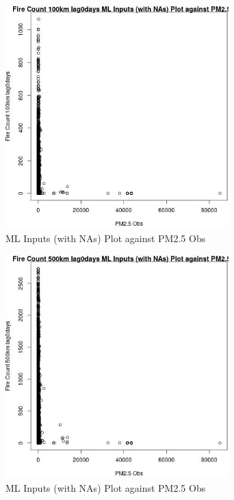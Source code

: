 \begin{figure} 
\centering  
\includegraphics[width=0.77\textwidth]{Code_Outputs/Report_ML_input_PM25_Step4_part_f_de_duplicated_aves_prioritize_24hr_obswNAs_Fire_Count_100km_lag0daysvPM25_Obs.jpg} 
\caption{\label{fig:Report_ML_input_PM25_Step4_part_f_de_duplicated_aves_prioritize_24hr_obswNAsFire_Count_100km_lag0daysvPM25_Obs}ML Inputs (with NAs) Plot against PM2.5 Obs} 
\end{figure} 
 

\begin{figure} 
\centering  
\includegraphics[width=0.77\textwidth]{Code_Outputs/Report_ML_input_PM25_Step4_part_f_de_duplicated_aves_prioritize_24hr_obswNAs_Fire_Count_500km_lag0daysvPM25_Obs.jpg} 
\caption{\label{fig:Report_ML_input_PM25_Step4_part_f_de_duplicated_aves_prioritize_24hr_obswNAsFire_Count_500km_lag0daysvPM25_Obs}ML Inputs (with NAs) Plot against PM2.5 Obs} 
\end{figure} 
 

